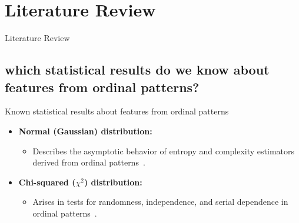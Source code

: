 \documentclass{beamer}
\begin{document}
\section{Literature Review}
\begin{frame}
	\begin{center}
		\alert{Literature Review}
	\end{center}
\end{frame}

\subsection{which statistical results do we know about features from ordinal patterns?}

\begin{frame}{Known statistical results about features from ordinal patterns}
	\begin{itemize}
		\item \textbf{Normal (Gaussian) distribution:}
		\begin{itemize}
			\item Describes the asymptotic behavior of entropy and complexity estimators derived from ordinal patterns~\cite{Chagas2022, Rey2023, Rey2023a, Rey2024, Rey2025}.
		\end{itemize}
		\item \textbf{Chi-squared ($\chi^2$) distribution:}
		\begin{itemize}
			\item Arises in tests for randomness, independence, and serial dependence in ordinal patterns~\cite{Rey2023, Rey2024, Rey2025, YamashitaRiosDeSousa2022, Shternshis2025}.
		\end{itemize}
	\end{itemize}
\end{frame}
\end{document}

